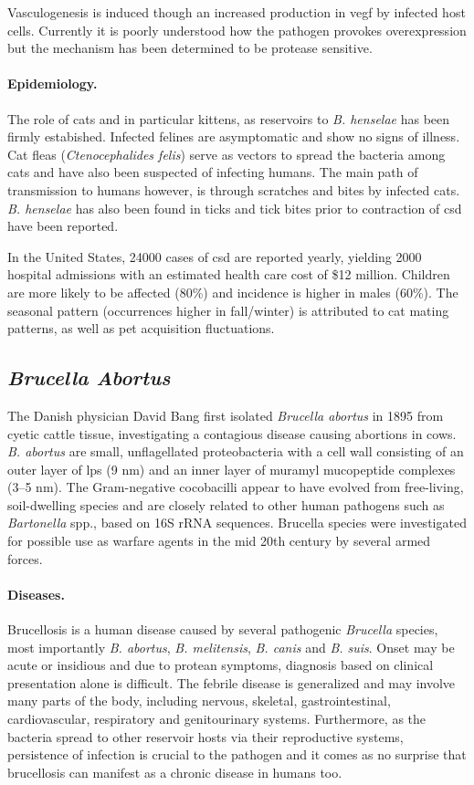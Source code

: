 Vasculogenesis is induced though an increased production in \gls{vegf} by infected host cells. Currently it is poorly understood how the pathogen provokes overexpression but the mechanism has been determined to be protease sensitive.

\paragraph{Epidemiology.}
The role of cats and in particular kittens, as reservoirs to \textit{B. henselae} has been firmly estabished. Infected felines are asymptomatic and show no signs of illness. Cat fleas (\textit{Ctenocephalides felis}) serve as vectors to spread the bacteria among cats and have also been suspected of infecting humans. The main path of transmission to humans however, is through scratches and bites by infected cats. \textit{B. henselae} has also been found in ticks and tick bites prior to contraction of \gls{csd} have been reported.

In the United States, 24000 cases of \gls{csd} are reported yearly, yielding 2000 hospital admissions with an estimated health care cost of \$12 million. Children are more likely to be affected (80\%) and incidence is higher in males (60\%). The seasonal pattern (occurrences higher in fall/winter) is attributed to cat mating patterns, as well as pet acquisition fluctuations.

\subsection{\textit{Brucella Abortus}}

The Danish physician David Bang first isolated \textit{Brucella abortus} in 1895 from cyetic cattle tissue, investigating a contagious disease causing abortions in cows. \textit{B. abortus} are small, unflagellated proteobacteria with a cell wall consisting of an outer layer of \gls{lps} (9 nm) and an inner layer of muramyl mucopeptide complexes (3--5 nm). The Gram-negative cocobacilli appear to have evolved from free-living, soil-dwelling species and are closely related to other human pathogens such as \textit{Bartonella} spp., based on 16S rRNA sequences. Brucella species were investigated for possible use as warfare agents in the mid 20th century by several armed forces. \citep{Atluri2011}

\paragraph{Diseases.}
Brucellosis is a human disease caused by several pathogenic \textit{Brucella} species, most importantly \textit{B. abortus}, \textit{B. melitensis}, \textit{B. canis} and \textit{B. suis}. Onset may be acute or insidious and due to protean symptoms, diagnosis based on clinical presentation alone is difficult. The febrile disease is generalized and may involve many parts of the body, including nervous, skeletal, gastrointestinal, cardiovascular, respiratory and genitourinary systems. Furthermore, as the bacteria spread to other reservoir hosts via their reproductive systems, persistence of infection is crucial to the pathogen and it comes as no surprise that brucellosis can manifest as a chronic disease in humans too.

